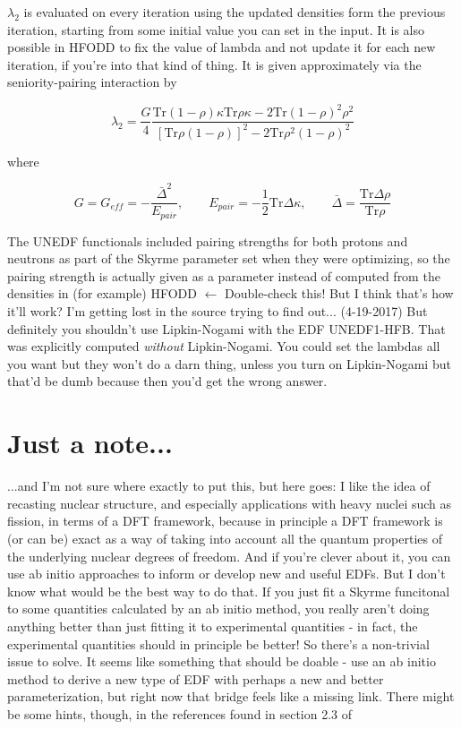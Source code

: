 $\lambda_2$ is evaluated on every iteration using the updated densities form the previous iteration, starting from some initial value you can set in the input. It is also possible in HFODD to fix the value of lambda and not update it for each new iteration, if you're into that kind of thing. It is given approximately via the seniority-pairing interaction by

\begin{equation*}
\lambda_2 = \frac{G}{4}\frac{\mathrm{Tr}(1-\rho)\kappa \mathrm{Tr}\rho\kappa-2\mathrm{Tr}(1-\rho)^2\rho^2}{\left[\mathrm{Tr}\rho(1-\rho)\right]^2-2\mathrm{Tr}\rho^2(1-\rho)^2}
\end{equation*}

\noindent where

\begin{equation*}
G = G_{eff} = -\frac{\bar{\Delta}^2}{E_{pair}}, \qquad E_{pair} = -\frac{1}{2}\mathrm{Tr}\Delta\kappa, \qquad \bar{\Delta} = \frac{\mathrm{Tr}\Delta\rho}{\mathrm{Tr}\rho}
\end{equation*}

The UNEDF functionals included pairing strengths for both protons and neutrons as part of the Skyrme parameter set when they were optimizing, so the pairing strength is actually given as a parameter instead of computed from the densities in (for example) HFODD $\leftarrow$ Double-check this! But I think that's how it'll work? I'm getting lost in the source trying to find out... (4-19-2017) But definitely you shouldn't use Lipkin-Nogami with the EDF UNEDF1-HFB. That was explicitly computed \textit{without} Lipkin-Nogami. You could set the lambdas all you want but they won't do a darn thing, unless you turn on Lipkin-Nogami but that'd be dumb because then you'd get the wrong answer.

\section*{Just a note...}
...and I'm not sure where exactly to put this, but here goes: I like the idea of recasting nuclear structure, and especially applications with heavy nuclei such as fission, in terms of a DFT framework, because in principle a DFT framework is (or can be) exact as a way of taking into account all the quantum properties of the underlying nuclear degrees of freedom. And if you're clever about it, you can use ab initio approaches to inform or develop new and useful EDFs. But I don't know what would be the best way to do that. If you just fit a Skyrme funcitonal to some quantities calculated by an ab initio method, you really aren't doing anything better than just fitting it to experimental quantities - in fact, the experimental quantities should in principle be better! So there's a non-trivial issue to solve. It seems like something that should be doable - use an ab initio method to derive a new type of EDF with perhaps a new and better parameterization, but right now that bridge feels like a missing link. There might be some hints, though, in the references found in section 2.3 of \cite{Schunck2015error_analysis}

%
